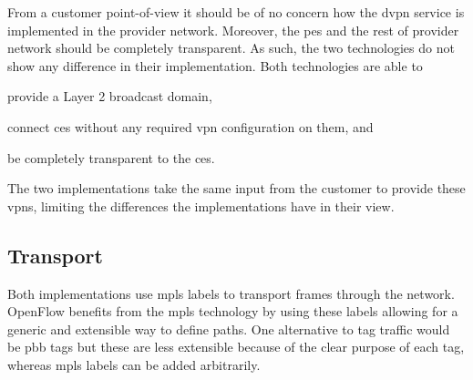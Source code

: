 From a customer point-of-view it should be of no concern how the \ac{dvpn} service is implemented in the provider network. Moreover, the \acp{pe} and the rest of provider network should be completely transparent. As such, the two technologies do not show any difference in their implementation. Both technologies are able to 
\begin{inparaenum}[\itshape 1\upshape)]
	\item provide a Layer 2 broadcast domain,
	\item connect \acp{ce} without any required \ac{vpn} configuration on them, and
	\item be completely transparent to the \acp{ce}.
\end{inparaenum}
The two implementations take the same input from the customer to provide these \acp{vpn}, limiting the differences the implementations have in their view.


\subsection{Transport} %
\label{sub:transport}

Both implementations use \ac{mpls} labels to transport frames through the network. OpenFlow benefits from the \ac{mpls} technology by using these labels allowing for a generic and extensible way to define paths. One alternative to tag traffic would be \ac{pbb} tags but these are less extensible because of the clear purpose of each tag, whereas \ac{mpls} labels can be added arbitrarily.

